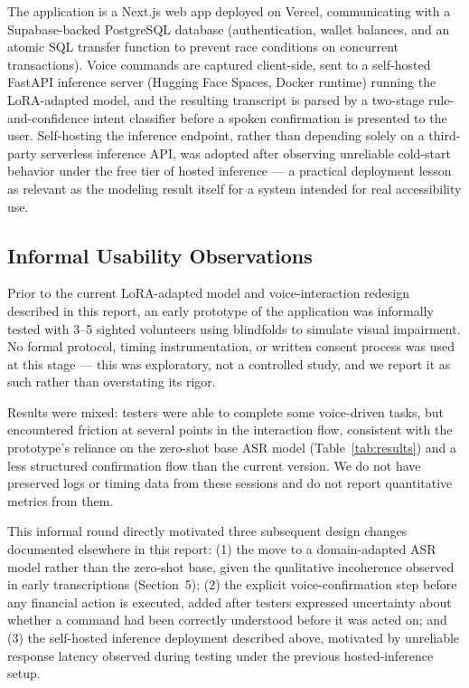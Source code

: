 \documentclass[11pt,a4paper]{article}
\begin{document}
The application is a Next.js web app deployed on Vercel, communicating with
a Supabase-backed PostgreSQL database (authentication, wallet balances, and
an atomic SQL transfer function to prevent race conditions on concurrent
transactions). Voice commands are captured client-side, sent to a
self-hosted FastAPI inference server (Hugging Face Spaces, Docker runtime)
running the LoRA-adapted model, and the resulting transcript is parsed by a
two-stage rule-and-confidence intent classifier before a spoken
confirmation is presented to the user. Self-hosting the inference endpoint,
rather than depending solely on a third-party serverless inference API,
was adopted after observing unreliable cold-start behavior under the free
tier of hosted inference --- a practical deployment lesson as relevant as
the modeling result itself for a system intended for real accessibility use.

\subsection{Informal Usability Observations}

Prior to the current LoRA-adapted model and voice-interaction redesign
described in this report, an early prototype of the application was
informally tested with 3--5 sighted volunteers using blindfolds to
simulate visual impairment. No formal protocol, timing instrumentation,
or written consent process was used at this stage --- this was
exploratory, not a controlled study, and we report it as such rather
than overstating its rigor.

Results were mixed: testers were able to complete some voice-driven
tasks, but encountered friction at several points in the interaction
flow, consistent with the prototype's reliance on the zero-shot base
ASR model (Table~\ref{tab:results}) and a less structured confirmation
flow than the current version. We do not have preserved logs or timing
data from these sessions and do not report quantitative metrics from
them.

This informal round directly motivated three subsequent design changes
documented elsewhere in this report: (1) the move to a domain-adapted
ASR model rather than the zero-shot base, given the qualitative
incoherence observed in early transcriptions (Section~5); (2) the
explicit voice-confirmation step before any financial action is
executed, added after testers expressed uncertainty about whether a
command had been correctly understood before it was acted on; and (3)
the self-hosted inference deployment described above, motivated by
unreliable response latency observed during testing under the
previous hosted-inference setup.
\end{document}
